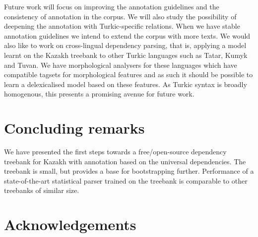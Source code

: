 \documentclass[a4paper,11pt, onecolumn,twoside]{article}
\begin{document}
Future work will focus on improving the annotation guidelines and the consistency of
annotation in the corpus. We will also study the possibility of deepening the annotation
with Turkic-specific relations. When we have stable annotation guidelines we intend to 
extend the corpus with more texts.
We would also like to work on cross-lingual dependency parsing,
that is, applying a model learnt on the Kazakh treebank to other Turkic languages
such as Tatar, Kumyk and Tuvan. We have morphological analysers for these languages which have
compatible tagsets for morphological features and as such it should be possible to learn a
delexicalised model based on these features. As Turkic syntax is broadly homogenous, this
presents a promising avenue for future work.


\section{Concluding remarks}\label{sec:conclusions}

We have presented the first steps towards a free/open-source dependency treebank for
Kazakh with annotation based on the universal dependencies. The treebank is small, but
provides a base for bootstrapping further. Performance of a state-of-the-art statistical
parser trained on the treebank is comparable to other treebanks of similar size.

\section*{Acknowledgements}


%
%
\begin{small}
\printbibliography
\end{small}
\end{document}
